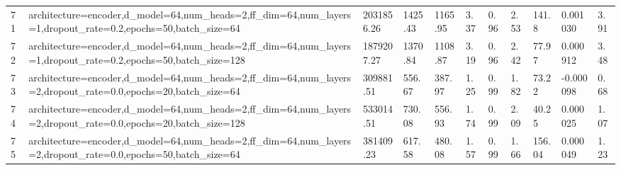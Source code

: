 \begin{longtable}{C{0.8cm} L{2cm} C{1.15cm} C{1.15cm} C{1.15cm} C{1.15cm} C{0.85cm} C{1.25cm} C{1.2cm} C{1.5cm} C{1.0cm}}
71 & architecture=encoder,\newline d\_model=64,\newline num\_heads=2,\newline ff\_dim=64,\newline num\_layers=1,\newline dropout\_rate=0.2,\newline epochs=50,\newline batch\_size=64 & 2031856.26 & 1425.43 & 1165.95 & 3.37 & 0.96 & 2.53 & 141.8 & 0.001030 & 3.91 \\
72 & architecture=encoder,\newline d\_model=64,\newline num\_heads=2,\newline ff\_dim=64,\newline num\_layers=1,\newline dropout\_rate=0.2,\newline epochs=50,\newline batch\_size=128 & 1879207.27 & 1370.84 & 1108.87 & 3.19 & 0.96 & 2.42 & 77.97 & 0.000912 & 3.48 \\
73 & architecture=encoder,\newline d\_model=64,\newline num\_heads=2,\newline ff\_dim=64,\newline num\_layers=2,\newline dropout\_rate=0.0,\newline epochs=20,\newline batch\_size=64 & 309881.51 & 556.67 & 387.97 & 1.25 & 0.99 & 1.82 & 73.22 & -0.000098 & 0.68 \\
74 & architecture=encoder,\newline d\_model=64,\newline num\_heads=2,\newline ff\_dim=64,\newline num\_layers=2,\newline dropout\_rate=0.0,\newline epochs=20,\newline batch\_size=128 & 533014.51 & 730.08 & 556.93 & 1.74 & 0.99 & 2.09 & 40.25 & 0.000025 & 1.07 \\
75 & architecture=encoder,\newline d\_model=64,\newline num\_heads=2,\newline ff\_dim=64,\newline num\_layers=2,\newline dropout\_rate=0.0,\newline epochs=50,\newline batch\_size=64 & 381409.23 & 617.58 & 480.08 & 1.57 & 0.99 & 1.66 & 156.04 & 0.000049 & 1.23 \\

\end{longtable}
